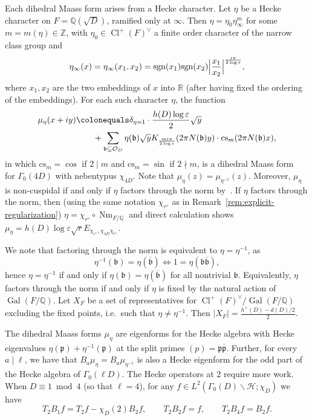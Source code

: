 \documentclass[11pt,reqno,oneside]{amsart}
\theoremstyle{plain}
\theoremstyle{definition}
\DeclareMathOperator{\Cl}{Cl}
\DeclareMathOperator{\Gal}{Gal}
\DeclareMathOperator{\Nm}{Nm}
\newcommand{\Q}{\mathbb{Q}}
\newcommand{\Z}{\mathbb{Z}}
\newcommand{\calH}{\mathcal{H}}
\newcommand{\calO}{\mathcal{O}}
\newcommand{\frakb}{\mathfrak{b}}
\newcommand{\frakp}{\mathfrak{p}}
\newcommand{\chid}{\chi_{4D}}
\begin{document}
Each dihedral Maass form arises from a Hecke character.
Let $\eta$ be a Hecke character on $F = \Q(\sqrt{D})$, ramified only at
$\infty$. Then $\eta = \eta_0 \eta_{\infty}^m$ for some $m = m(\eta) \in \Z$,
with $\eta_0 \in \Cl^+(F)^{\vee}$ a finite order character of the narrow class
group and
\begin{equation}
  \eta_{\infty}(x) =
  \eta_{\infty}(x_1, x_2)
  =
  \mathrm{sgn}(x_1) \mathrm{sgn}(x_2)
  \Bigl \lvert \frac{x_1}{x_2} \Bigr \rvert^{\frac{i \pi}{2 \log \varepsilon}},
\end{equation}
where $x_1, x_2$ are the two embeddings of $x$ into $\mathbb{R}$ (after having
fixed the ordering of the embeddings).
For each such character $\eta$, the function
\begin{align}
  \mu_{\eta}(x+iy)
   & \colonequals
  \delta_{\eta=1} \cdot \frac{h(D) \log \varepsilon}{2}  \sqrt{y} \\
   & \qquad +
  \sum_{\frakb \subseteq \calO_D} \eta(\frakb)
  \sqrt{y} K_{\frac{m i \pi}{2 \log \varepsilon}} (2 \pi N(\frakb) y)
  \cdot
  \mathrm{cs}_m(2 \pi N(\frakb) x),
\end{align}
in which $\mathrm{cs}_m = \cos $ if $2 \mid m$ and $ \mathrm{cs}_m = \sin $ if
$ 2 \nmid m$, is a dihedral Maass form~\cite{Maass} for $\Gamma_0(4D)$ with
nebentypus $\chid$.
Note that $\mu_{\eta}(z) = \mu_{\eta^{-1}}(z)$. Moreover, $\mu_\eta$ is non-cuspidal
if and only if $\eta$ factors through the norm by~\cite[Cor.\ 6.6]{ll1979}.
If $\eta$ factors through the norm, then (using the same notation
$\chi_{r^\diamond}$ as in Remark~\ref{rem:explicit-regularization})
$\eta = \chi_{r^{\diamond}} \circ \Nm_{F/\Q}$ and direct calculation shows
$\mu_{\eta} = h(D) \log \varepsilon \sqrt{r} E_{\chi_{r^{\diamond}}, \chid
      \chi_{r^{\diamond}}}$.

We note that factoring through the norm is equivalent to $\eta = \eta^{-1}$, as
\[
  \eta^{-1}(\frakb) = \eta(\overline{\frakb})
  \iff
  1 = \eta(\frakb \overline{\frakb}),
\]
hence $\eta = \eta^{-1}$ if and only if $\eta(\frakb) =
  \eta(\overline{\frakb})$ for all nontrivial $\frakb$.
Equivalently, $\eta$ factors through the norm if and only if $\eta$ is fixed
by the natural action of $\Gal(F/ \Q)$.
Let $X_F$ be a set of representatives for $\Cl^+(F)^{\vee} / \Gal(F / \Q)$
excluding the fixed points, i.e.\ such that $\eta \ne \eta^{-1}$.
Then $\lvert X_F \rvert = \tfrac{h^+(D) - d(D)/2}{2}$.

The dihedral Maass forms $\mu_\eta$ are eigenforms for the Hecke algebra with
Hecke eigenvalues $\eta(\frakp) + \eta^{-1}(\frakp)$ at the split primes
$(p) = \frakp \overline{\frakp}$.
Further, for every $a \mid \ell$, we have that $B_a \mu_{\eta} = B_a \mu_{\eta^{-1}}$
is also a Hecke eigenform for the odd part
of the Hecke algebra of $\Gamma_0(\ell D)$.
The Hecke operators at $2$ require more work.
When $D \equiv 1 \bmod 4$ (so that $\ell = 4$), for any
$f \in L^2(\Gamma_0(D) \backslash \calH ; \chi_{D})$
we have
\[
  T_2 B_1 f = T_2 f - \chi_D(2) B_2 f, \qquad
  T_2 B_2 f = f, \qquad
  T_2 B_4 f = B_2 f.
\]
\end{document}

